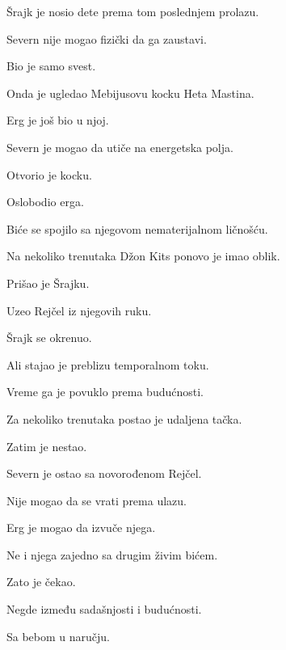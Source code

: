\bigskip

Šrajk je nosio dete prema tom poslednjem prolazu.

\bigskip

Severn nije mogao fizički da ga zaustavi.

Bio je samo svest.

\bigskip

Onda je ugledao Mebijusovu kocku Heta Mastina.

\bigskip

Erg je još bio u njoj.

\bigskip

Severn je mogao da utiče na energetska polja.

Otvorio je kocku.

\bigskip

Oslobodio erga.

\bigskip

Biće se spojilo sa njegovom nematerijalnom ličnošću.

\bigskip

Na nekoliko trenutaka Džon Kits ponovo je imao oblik.

\bigskip

Prišao je Šrajku.

Uzeo Rejčel iz njegovih ruku.

\bigskip

Šrajk se okrenuo.

\bigskip

Ali stajao je preblizu temporalnom toku.

\bigskip

Vreme ga je povuklo prema budućnosti.

\bigskip

Za nekoliko trenutaka postao je udaljena tačka.

Zatim je nestao.

\bigskip

Severn je ostao sa novorođenom Rejčel.

\bigskip

Nije mogao da se vrati prema ulazu.

Erg je mogao da izvuče njega.

Ne i njega zajedno sa drugim živim bićem.

\bigskip

Zato je čekao.

\bigskip

Negde između sadašnjosti i budućnosti.

Sa bebom u naručju.

